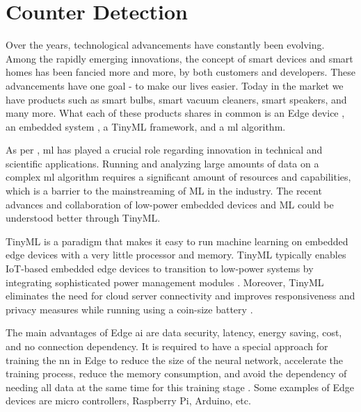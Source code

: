 %
%
%
%

\chapter{Counter Detection}

Over the years, technological advancements have constantly been evolving. Among the rapidly emerging innovations, the concept of smart devices and smart homes has been fancied more and more, by both customers and developers. These advancements have one goal - to make our lives easier. Today in the market we have products such as smart bulbs, smart vacuum cleaners, smart speakers, and many more. What each of these products shares in common is an Edge device \cite{Posey:2020}, an embedded system \cite{Reidt:2022}, a TinyML framework, and a \ac{ml} algorithm.

As per \cite{Osman:2021}, \ac{ml} has played a crucial role regarding innovation in technical and scientific applications. Running and analyzing large amounts of data on a complex \ac{ml} algorithm requires a significant amount of resources and capabilities, which is a barrier to the mainstreaming of ML in the industry. The recent advances and collaboration of low-power embedded devices and ML could be understood better through TinyML.

TinyML is a paradigm that makes it easy to run machine learning on embedded edge devices with a very little processor and memory. TinyML typically enables IoT-based embedded edge devices to transition to low-power systems by integrating sophisticated power management modules \cite{Ray:2022}. Moreover, TinyML eliminates the need for cloud server connectivity and improves responsiveness and privacy measures while running using a coin-size battery \cite{Osman:2021}.

The main advantages of Edge \ac{ai} are data security, latency, energy saving, cost, and no connection dependency. It is required to have a special approach for training the \ac{nn} in Edge to reduce the size of the neural network, accelerate the training process, reduce the memory consumption, and avoid the dependency of needing all data at the same time for this training stage \cite{Rüb:2022}. Some examples of Edge devices are micro controllers, Raspberry Pi, Arduino, etc.

